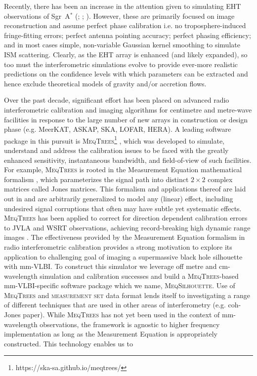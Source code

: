 Recently, there has been an increase in the attention given to simulating EHT observations of Sgr~A$^*$ (\citealt{Fish_2014}; \citealt{Lu_2014}; \citealt{2015arXiv151201413B}). However, these are primarily focused on image reconstruction and assume perfect phase calibration i.e. no troposphere-induced fringe-fitting errors; perfect antenna pointing accuracy; perfect phasing efficiency; and in most cases simple, non-variable Gaussian kernel smoothing to simulate ISM scattering. Clearly, as the EHT array is enhanced (and likely expanded), so too must the interferometric simulations evolve to provide ever-more realistic predictions on the confidence levels with which parameters can be extracted and hence exclude theoretical models of gravity and/or accretion flows.


Over the past decade, significant effort has been placed on advanced radio interferometric calibration and imaging algorithms for centimetre and metre-wave facilities in response to the large number of new arrays in construction or design phase (e.g. MeerKAT, ASKAP, SKA, LOFAR, HERA). A leading software package in this pursuit is \textsc{MeqTrees}\footnote{https://ska-sa.github.io/meqtrees/} \citep*{Noordam_2010}, which was developed to simulate, understand and address the calibration issues to be faced with the greatly enhanced sensitivity, instantaneous bandwidth, and field-of-view of such facilities. For example, \textsc{MeqTrees} is rooted in the Measurement Equation mathematical formalism \citep{Hamaker_1996}, which parameterizes the signal path into distinct $2 \times 2$ complex  matrices called Jones matrices. This formalism and applications thereof are laid out in \citep{Smirnov_2011a,Smirnov_2011b,Smirnov_2011c} and are arbitrarily generalized to model any (linear) effect, including undesired signal corruptions that often may have subtle yet systematic effects. \textsc{MeqTrees} has been applied to correct for direction dependent calibration errors to JVLA and WSRT observations, achieving record-breaking high dynamic range images \citep{Smirnov_2011c}. The effectiveness provided by the Measurement Equation formalism in radio interferometric calibration provides a strong motivation to explore its application to challenging goal of imaging a supermassive black hole silhouette with mm-VLBI. To construct this simulator we leverage off metre and cm-wavelength simulation and calibration successes and build a \textsc{MeqTrees}-based mm-VLBI-specific software package which we name, \textsc{MeqSilhouette}.  Use of \textsc{MeqTrees} and \textsc{measurement set} data format lends itself to investigating a range of different techniques that are used in other areas of interferometry (e.g. coh-Jones paper). While \textsc{MeqTrees} has not yet been used in the context of mm-wavelength observations, the framework is agnostic to higher frequency implementation as long as the Measurement Equation is appropriately constructed. This technology enables us to


